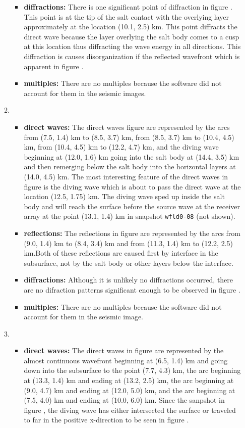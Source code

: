 \begin{enumerate}
\begin{enumerate}
\begin{itemize}
      \item \textbf{diffractions:} There is one significant point of diffraction in figure . This point is at the tip of the salt contact with the overlying layer approximately at the location (10.1, 2.5) km. This point diffracts the direct wave because the layer overlying the salt body comes to a cusp at this location thus diffracting the wave energy in all directions. This diffraction is causes disorganization if the reflected wavefront which is apparent in figure .
      \item \textbf{multiples:} There are no multiples because the software did not account for them in the seismic images.
    \end{itemize}
    \item[\rfn{wfld0-12}]
    \begin{itemize}
      \item \textbf{direct waves:} The direct waves figure  are represented by the arcs from (7.5, 1.4) km to (8.5, 3.7) km, from (8.5, 3.7) km to (10.4, 4.5) km, from (10.4, 4.5) km to (12.2, 4.7) km, and the diving wave beginning at (12.0, 1.6) km going into the salt body at (14.4, 3.5) km and then remerging below the salt body into the horizontal layers at (14.0, 4.5) km. The most interesting feature of the direct waves in figure  is the diving wave which is about to pass the direct wave at the location (12.5, 1.75) km. The diving wave sped up inside the salt body and will reach the surface before the source wave at the receiver array at the point (13.1, 1.4) km in snapshot \texttt{wfld0-08} (not shown).
      \item \textbf{reflections:} The reflections in figure  are represented by the arcs from (9.0, 1.4) km to (8.4, 3.4) km and from (11.3, 1.4) km to (12.2, 2.5) km.Both of these reflections are caused first by interface in the subsurface, not by the salt body or other layers below the interface.
      \item \textbf{diffractions:} Although it is unlikely no diffractions occurred, there are no difraction patterns significant enough to be observed in figure .
      \item \textbf{multiples:} There are no multiples because the software did not account for them in the seismic image.
    \end{itemize}
    \item[\rfn{wfld0-16}]
    \begin{itemize}
      \item \textbf{direct waves:} The direct waves in figure  are represented by the almost continuous wavefront beginning at (6.5, 1.4) km and going down into the subsurface to the point (7.7, 4.3) km, the arc beginning at (13.3, 1.4) km and ending at (13.2, 2.5) km, the arc beginning at (9.0, 4.7) km and ending at (12.0, 5.0) km, and the arc beginning at (7.5, 4.0) km and ending at (10.0, 6.0) km. Since the sanpshot in figure , the diving wave has either intersected the surface or traveled to far in the positive x-direction to be seen in figure .

\end{itemize}
\end{enumerate}
\end{enumerate}
